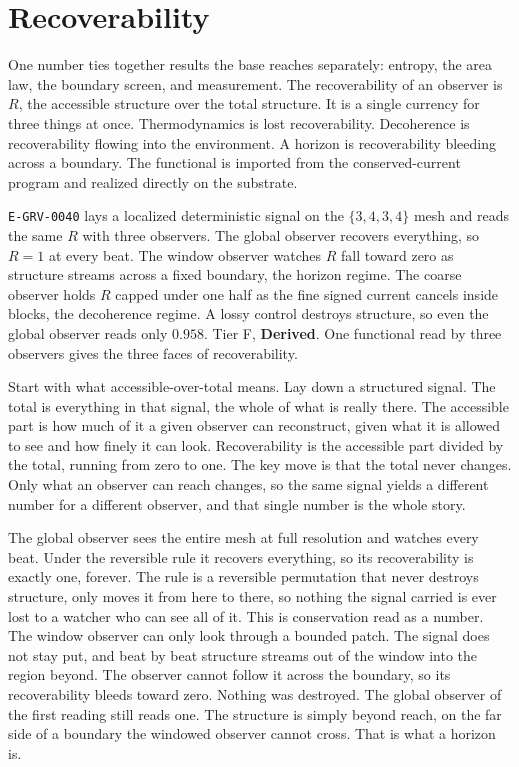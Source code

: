 \section{Recoverability}

One number ties together results the base reaches separately: entropy, the area
law, the boundary screen, and measurement. The recoverability of an observer is
$R$, the accessible structure over the total structure. It is a single currency
for three things at once. Thermodynamics is lost recoverability. Decoherence is
recoverability flowing into the environment. A horizon is recoverability bleeding
across a boundary. The functional is imported from the conserved-current program
\cite{herbert2025chronoflux} and realized directly on the substrate.

\begin{finding}
\texttt{E-GRV-0040} lays a localized deterministic signal on the $\{3,4,3,4\}$ mesh and
reads the same $R$ with three observers. The global observer recovers everything,
so $R = 1$ at every beat. The window observer watches $R$ fall toward zero as
structure streams across a fixed boundary, the horizon regime. The coarse
observer holds $R$ capped under one half as the fine signed current cancels
inside blocks, the decoherence regime. A lossy control destroys structure, so
even the global observer reads only $0.958$. Tier F, \textbf{Derived}. One
functional read by three observers gives the three faces of recoverability.
\end{finding}

Start with what accessible-over-total means. Lay down a structured signal. The
total is everything in that signal, the whole of what is really there. The
accessible part is how much of it a given observer can reconstruct, given what it
is allowed to see and how finely it can look. Recoverability is the accessible
part divided by the total, running from zero to one. The key move is that the
total never changes. Only what an observer can reach changes, so the same signal
yields a different number for a different observer, and that single number is the
whole story.

The global observer sees the entire mesh at full resolution and watches every
beat. Under the reversible rule it recovers everything, so its recoverability is
exactly one, forever. The rule is a reversible permutation that never destroys
structure, only moves it from here to there, so nothing the signal carried is
ever lost to a watcher who can see all of it. This is conservation read as a
number. The window observer can only look through a bounded patch. The signal
does not stay put, and beat by beat structure streams out of the window into the
region beyond. The observer cannot follow it across the boundary, so its
recoverability bleeds toward zero. Nothing was destroyed. The global observer of
the first reading still reads one. The structure is simply beyond reach, on the
far side of a boundary the windowed observer cannot cross. That is what a horizon
is.

